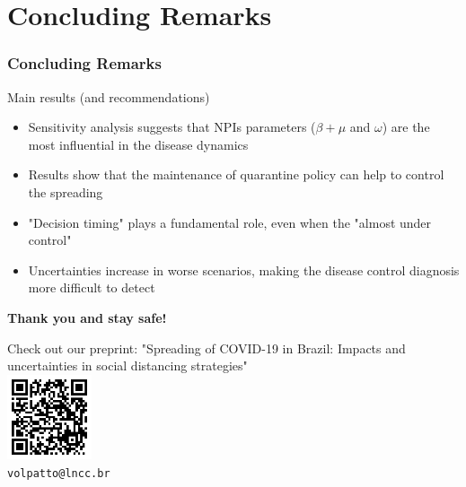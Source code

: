 \documentclass{beamer}
\begin{document}
\section{Concluding Remarks}


\begin{frame}
\frametitle{Concluding Remarks}
\begin{block}{Main results (and recommendations)}
	\begin{itemize}
		\item Sensitivity analysis suggests that NPIs parameters ($\beta + \mu$ and $\omega$) are the most influential in the disease dynamics
		\item Results show that the maintenance of quarantine policy can help to control the spreading
		\item "Decision timing" plays a fundamental role, even when the "almost under control"
		\item Uncertainties increase in worse scenarios, making the disease control diagnosis more difficult to detect
	\end{itemize}
\end{block}

\end{frame}

\begin{frame}
\begin{center}
    \textcolor{lncc-color}{\Large\textbf{Thank you and stay safe!}}
\end{center}
\vspace{2.em}
\begin{center}
Check out our preprint: "Spreading of COVID-19 in Brazil: Impacts and uncertainties in social distancing strategies" \\
\vspace{1.em}
\includegraphics[height=2.5cm,keepaspectratio]{figs/art.png} \\
\vspace{3em}
\texttt{volpatto@lncc.br}
\end{center}

\end{frame} 
\end{document}
